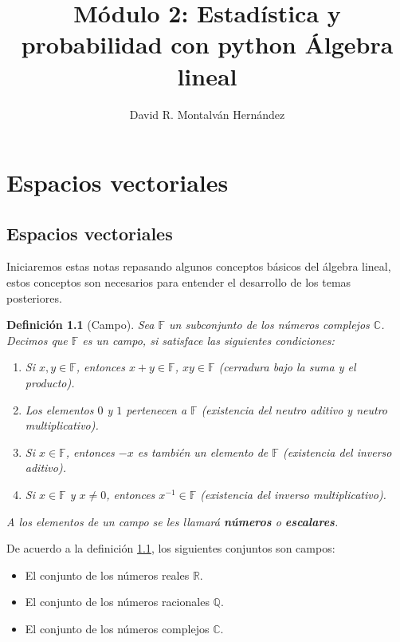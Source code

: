 \documentclass[11pt]{report}
\title{Módulo 2: Estadística y probabilidad con python \newline Álgebra lineal}
\author{David R. Montalván Hernández}
\date{}
\theoremstyle{break}
\newtheorem{definicion}{Definición}[chapter]
\theoremstyle{break}
\begin{document}
\maketitle
\renewcommand{\contentsname}{Contenido}
\tableofcontents
\renewcommand{\listfigurename}{Lista de imágenes}
\listoffigures
\renewcommand{\listtablename}{Lista de tablas}
\renewcommand\tablename{Tabla}
\renewcommand{\bibname}{Referencias}
\renewcommand{\figurename}{Figura}
\renewcommand{\chaptername}{Capítulo}
\listoftables

\chapter{Espacios vectoriales}
\label{capitulo:espacios-vectoriales}
\section{Espacios vectoriales}
\label{seccion:espacios-vectoriales}
Iniciaremos estas notas repasando algunos conceptos básicos del álgebra lineal, estos conceptos son necesarios para entender el desarrollo de los temas posteriores.

\begin{definicion}[Campo]
\label{definicion:campo}
Sea $\mathbb{F}$ un subconjunto de los números complejos $\mathbb{C}$. Decimos que $\mathbb{F}$ es un campo, si satisface las siguientes condiciones:

\begin{enumerate}
\item Si $x,y \in \mathbb{F}$, entonces $x + y \in \mathbb{F}$, $xy \in \mathbb{F}$ (cerradura bajo la suma y el producto).
\item Los elementos $0$ y $1$ pertenecen a $\mathbb{F}$ (existencia del neutro aditivo y neutro multiplicativo).
\item Si $x \in \mathbb{F}$, entonces $-x$ es también un elemento de $\mathbb{F}$ (existencia del inverso aditivo).
\item Si $x \in \mathbb{F}$ y $x \neq 0$, entonces $x^{-1} \in \mathbb{F}$ (existencia del inverso multiplicativo).
\end{enumerate}

A los elementos de un campo se les llamará \textbf{números} o \textbf{escalares}.
\end{definicion}

De acuerdo a la definición \ref{definicion:campo}, los siguientes conjuntos son campos:
\begin{itemize}
\item El conjunto de los números reales $\mathbb{R}$.
\item El conjunto de los números racionales $\mathbb{Q}$.
\item El conjunto de los números complejos $\mathbb{C}$.
\end{itemize}
\end{document}
